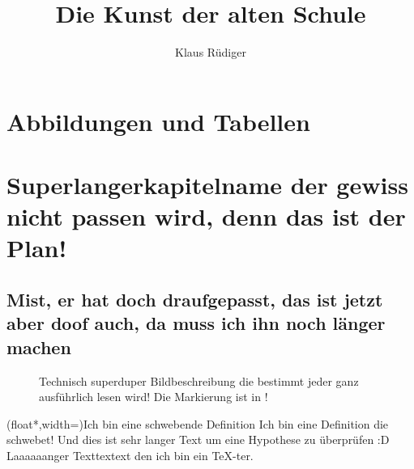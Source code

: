\documentclass[userip,ngerman]{lecture-digital}
\title{Die Kunst der alten Schule}
\subtitle{Klaus Rüdiger}
\begin{document}
\frontmatter
\maketitle

\RipPage{}%

\tableofcontents
\chapter{Abbildungen und Tabellen}
\listoffigures
\listoftables

\mainmatter

\chapter{Superlangerkapitelname der gewiss nicht passen wird, denn das ist der Plan!}

\section{Mist, er hat doch draufgepasst, das ist jetzt aber doof auch, da muss ich ihn noch länger machen}

\Blindtext[1]
\begin{figure}
    \centering{}
    \caption{Technisch superduper Bildbeschreibung die bestimmt jeder ganz ausführlich lesen wird! Die Markierung ist in \tikzAname!}
    \label{fig:example-intersect}
\end{figure}
\begin{definition}(float*,width=\textwidth){Ich bin eine schwebende Definition}
    Ich bin eine Definition die schwebet! Und dies ist sehr langer Text um eine Hypothese zu überprüfen :D Laaaaaanger Texttextext den ich bin ein \TeX-ter.
\end{definition}
\end{document}
